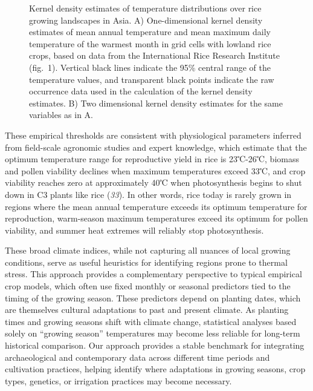 \documentclass[
  letterpaper,
  DIV=11,
  numbers=noendperiod]{scrartcl}
\makeatletter
\newcommand*\pandocbounded[1]{%
  \sbox\pandoc@box{#1}%
  \Gscale@div\@tempa{\textheight}{\dimexpr\ht\pandoc@box+\dp\pandoc@box\relax}%
  \Gscale@div\@tempb{\linewidth}{\wd\pandoc@box}%
  \ifdim\@tempb\p@<\@tempa\p@\let\@tempa\@tempb\fi%
  \ifdim\@tempa\p@<\p@\scalebox{\@tempa}{\usebox\pandoc@box}%
  \else\usebox{\pandoc@box}%
  \fi%
}
\makeatother
\begin{document}
\label{cell-fig-kde-modern}
\begin{figure}[H]

\centering{

\pandocbounded{\texttt{[image: main\_files/figure-pdf/fig-kde-modern-1.pdf]}}

}

\caption{\label{fig-kde-modern}Kernel density estimates of temperature
distributions over rice growing landscapes in Asia. A) One-dimensional
kernel density estimates of mean annual temperature and mean maximum
daily temperature of the warmest month in grid cells with lowland rice
crops, based on data from the International Rice Research Institute
(fig.~1). Vertical black lines indicate the 95\% central range of the
temperature values, and transparent black points indicate the raw
occurrence data used in the calculation of the kernel density estimates.
B) Two dimensional kernel density estimates for the same variables as in
A.}

\end{figure}%

These empirical thresholds are consistent with physiological parameters
inferred from field-scale agronomic studies and expert knowledge, which
estimate that the optimum temperature range for reproductive yield in
rice is 23℃-26℃, biomass and pollen viability declines when maximum
temperatures exceed 33℃, and crop viability reaches zero at
approximately 40℃ when photosynthesis begins to shut down in C3 plants
like rice (\emph{33}). In other words, rice today is rarely grown in
regions where the mean annual temperature exceeds its optimum
temperature for reproduction, warm-season maximum temperatures exceed
its optimum for pollen viability, and summer heat extremes will reliably
stop photosynthesis.

These broad climate indices, while not capturing all nuances of local
growing conditions, serve as useful heuristics for identifying regions
prone to thermal stress. This approach provides a complementary
perspective to typical empirical crop models, which often use fixed
monthly or seasonal predictors tied to the timing of the growing season.
These predictors depend on planting dates, which are themselves cultural
adaptations to past and present climate. As planting times and growing
seasons shift with climate change, statistical analyses based solely on
``growing season'' temperatures may become less reliable for long-term
historical comparison. Our approach provides a stable benchmark for
integrating archaeological and contemporary data across different time
periods and cultivation practices, helping identify where adaptations in
growing seasons, crop types, genetics, or irrigation practices may
become necessary.
\end{document}
